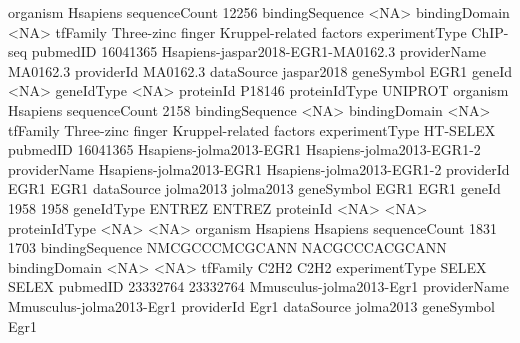 \documentclass{article}
\renewenvironment{Schunk}{\vspace{\topsep}}{\vspace{\topsep}}
\begin{document}
\begin{Schunk}
\begin{Soutput}
organism        Hsapiens                                  
sequenceCount   12256                                     
bindingSequence <NA>                                      
bindingDomain   <NA>                                      
tfFamily        Three-zinc finger Kruppel-related factors 
experimentType  ChIP-seq                                  
pubmedID        16041365                                  
                Hsapiens-jaspar2018-EGR1-MA0162.3         
providerName    MA0162.3                                  
providerId      MA0162.3                                  
dataSource      jaspar2018                                
geneSymbol      EGR1                                      
geneId          <NA>                                      
geneIdType      <NA>                                      
proteinId       P18146                                    
proteinIdType   UNIPROT                                   
organism        Hsapiens                                  
sequenceCount   2158                                      
bindingSequence <NA>                                      
bindingDomain   <NA>                                      
tfFamily        Three-zinc finger Kruppel-related factors 
experimentType  HT-SELEX                                  
pubmedID        16041365                                  
                Hsapiens-jolma2013-EGR1 Hsapiens-jolma2013-EGR1-2
providerName    Hsapiens-jolma2013-EGR1 Hsapiens-jolma2013-EGR1-2
providerId      EGR1                    EGR1                     
dataSource      jolma2013               jolma2013                
geneSymbol      EGR1                    EGR1                     
geneId          1958                    1958                     
geneIdType      ENTREZ                  ENTREZ                   
proteinId       <NA>                    <NA>                     
proteinIdType   <NA>                    <NA>                     
organism        Hsapiens                Hsapiens                 
sequenceCount   1831                    1703                     
bindingSequence NMCGCCCMCGCANN          NACGCCCACGCANN           
bindingDomain   <NA>                    <NA>                     
tfFamily        C2H2                    C2H2                     
experimentType  SELEX                   SELEX                    
pubmedID        23332764                23332764                 
                Mmusculus-jolma2013-Egr1
providerName    Mmusculus-jolma2013-Egr1
providerId      Egr1                    
dataSource      jolma2013               
geneSymbol      Egr1                    

\end{Soutput}
\end{Schunk}
\end{document}
